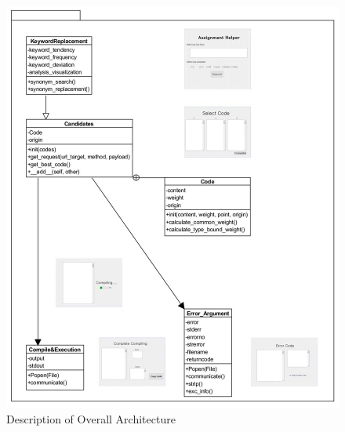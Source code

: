 \documentclass[conference]{IEEEtran}
\begin{document}

\begin{figure}
\centering
\includegraphics[width=1\textwidth]{./figures/overall_arch.jpg}
\caption{Description of Overall Architecture}
\label{overall}
\end{figure}









\end{document}
